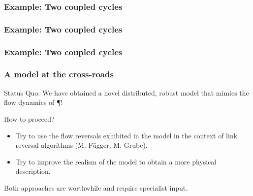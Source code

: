 \documentclass[	hyperref={pdfpagelabels=false}, xcolor=dvipsnames,
		11pt]{beamer}
\begin{document}
\begin{frame}
	\frametitle{Example: Two coupled cycles}
		\begin{figure}
			\centering
			\captionsetup[subfloat]{position=bottom,labelformat=empty,font=scriptsize}
		\end{figure}
\end{frame}
\begin{frame}
	\frametitle{Example: Two coupled cycles}
		\begin{figure}
			\centering
			\captionsetup[subfloat]{position=bottom,labelformat=empty,font=scriptsize}
		\end{figure}
\end{frame}
\begin{frame}
	\frametitle{Example: Two coupled cycles}
		\begin{figure}
			\centering
			\captionsetup[subfloat]{position=bottom,labelformat=empty,font=scriptsize}
		\end{figure}
\end{frame}

\begin{frame}
	\frametitle{A model at the cross-roads}

	\begin{block}{Status Quo:}
		We have obtained a novel distributed, robust model that mimics the flow dynamics of \P!
	\end{block}
	\begin{alertblock}{How to proceed?}
		\begin{itemize}
			\item Try to use the flow reversals exhibited in the model in the context of link reversal algorithms (M. Függer, M. Grube).
			\item Try to improve the realism of the model to obtain a more physical description.
		\end{itemize}
	\end{alertblock}

	Both approaches are worthwhile and require specialist input.
\end{frame}
\end{document}
